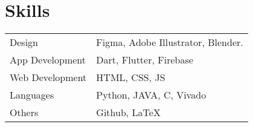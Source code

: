 \documentclass{article}
\begin{document}
\section{Skills}
\begin{tabularx}{\linewidth}{@{}l X@{}}
Design &  \normalsize{Figma, Adobe Illustrator, Blender.}\\
App Development  &  \normalsize{Dart, Flutter, Firebase}\\
Web Development  &  \normalsize{HTML, CSS, JS}\\  
Languages  &  \normalsize{Python, JAVA, C, Vivado}\\
Others &  \normalsize{Github, LaTeX}
\end{tabularx}

\vfill
{}
\end{document}
